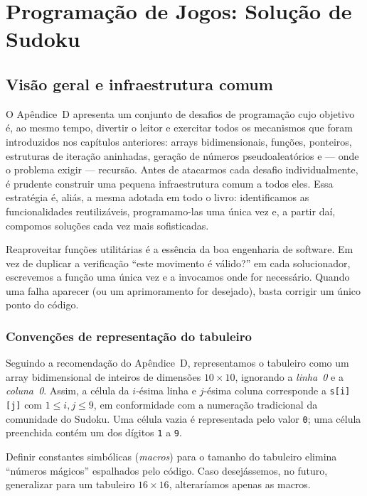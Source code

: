 \documentclass[11pt,a4paper,oneside]{report}
\newcommand{\codigo}[1]{\texttt{\color{deitelblue}#1}}
\begin{document}
\chapter{Programação de Jogos: Solução de Sudoku}

\section{Visão geral e infraestrutura comum}

O Apêndice~D apresenta um conjunto de desafios de programação cujo objetivo
é, ao mesmo tempo, divertir o leitor e exercitar todos os mecanismos que
foram introduzidos nos capítulos anteriores: arrays bidimensionais, funções,
ponteiros, estruturas de iteração aninhadas, geração de números pseudoaleatórios
e --- onde o problema exigir --- recursão. Antes de atacarmos cada desafio
individualmente, é prudente construir uma pequena infraestrutura comum a
todos eles. Essa estratégia é, aliás, a mesma adotada em todo o livro:
identificamos as funcionalidades reutilizáveis, programamo-las uma única vez
e, a partir daí, compomos soluções cada vez mais sofisticadas.

\begin{engenharia}
Reaproveitar funções utilitárias é a essência da boa engenharia de software.
Em vez de duplicar a verificação ``este movimento é válido?'' em cada
solucionador, escrevemos a função uma única vez e a invocamos onde for
necessário. Quando uma falha aparecer (ou um aprimoramento for desejado),
basta corrigir um único ponto do código.
\end{engenharia}

\subsection{Convenções de representação do tabuleiro}

Seguindo a recomendação do Apêndice~D, representamos o tabuleiro como um
array bidimensional de inteiros de dimensões $10 \times 10$, ignorando a
\emph{linha~0} e a \emph{coluna~0}. Assim, a célula da $i$-ésima linha e
$j$-ésima coluna corresponde a \codigo{s[i][j]} com $1 \le i,j \le 9$,
em conformidade com a numeração tradicional da comunidade do Sudoku. Uma
célula vazia é representada pelo valor \codigo{0}; uma célula preenchida
contém um dos dígitos \codigo{1} a \codigo{9}.

\begin{boapratica}
Definir constantes simbólicas (\textit{macros}) para o tamanho do tabuleiro
elimina ``números mágicos'' espalhados pelo código. Caso desejássemos, no
futuro, generalizar para um tabuleiro $16 \times 16$, alteraríamos apenas
as macros.
\end{boapratica}
\end{document}
